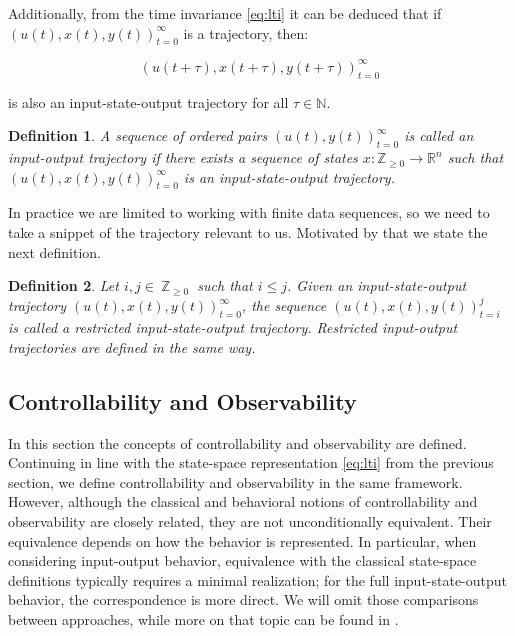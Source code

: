\documentclass[12pt,a4paper]{report}
\newtheorem{definition}{Definition}
\begin{document}
Additionally, from the time invariance \eqref{eq:lti} it can be deduced that if \(\left(u(t), x(t), y(t)\right)_{t=0}^{\infty}\) is a trajectory, then:

\[\left( u(t + \tau), x(t + \tau), y(t + \tau) \right)_{t=0}^{\infty}\]

is also an input-state-output trajectory for all \(\tau \in \mathbb{N}\).
\begin{definition}
    A sequence of ordered pairs \(\left( u(t), y(t) \right)_{t=0}^{\infty}\) is called an input-output trajectory if
there exists a sequence of states \(x: \mathbb{Z}_{\ge 0} \to \mathbb{R}^{n}\) such that \(\left( u(t), x(t), y(t) \right)_{t=0}^{\infty}\)
is an input-state-output trajectory.
\end{definition}

In practice we are limited to working with finite data sequences, so we
need to take a snippet of the trajectory relevant to us. Motivated by that we state the next definition.

\clearpage
\begin{definition}
    Let \(i,j \in\ \mathbb{Z}_{\ge 0}\ \) such that \(i \leq j\). Given an input-state-output trajectory  \(\left( u(t), x(t), y(t) \right)_{t=0}^{\infty}\),
    the sequence  \(\left( u(t), x(t), y(t) \right)_{t=i}^{j}\) is called a \textit{restricted input-state-output trajectory}. Restricted
    input-output trajectories are defined in the same way.
\end{definition}

\subsection{Controllability and Observability}

In this section the concepts of controllability and observability are defined. Continuing in line with the state-space representation \eqref{eq:lti} from the previous section,
we define controllability and observability in the same framework. However, although the classical and behavioral notions of controllability
and observability are closely related, they are not unconditionally equivalent. Their equivalence depends on how the behavior is represented.
In particular, when considering input-output behavior, equivalence with the classical state-space definitions typically requires a minimal realization;
for the full input-state-output behavior, the correspondence is more direct. We will omit those comparisons between approaches, while more on that
topic can be found in \cite{markovsky2023behavioral}.
\end{document}
